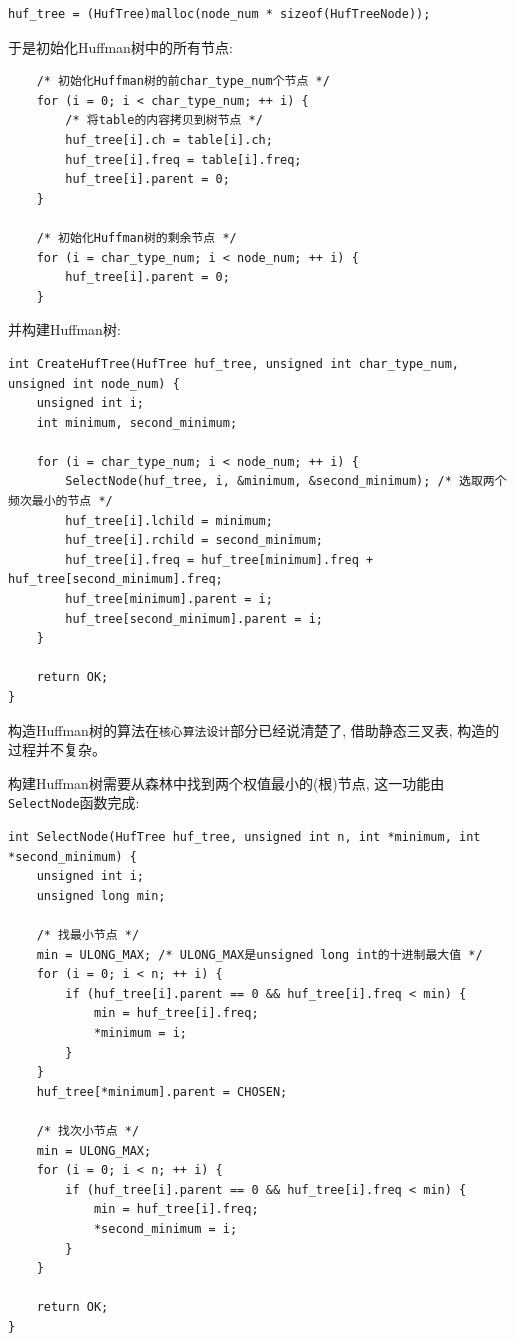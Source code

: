 \documentclass{ctexart}
\begin{document}
{\setmainfont{Courier New Bold}              
\begin{lstlisting}
huf_tree = (HufTree)malloc(node_num * sizeof(HufTreeNode));
\end{lstlisting}}

于是初始化Huffman树中的所有节点:

{\setmainfont{Courier New Bold}              
\begin{lstlisting}
    /* 初始化Huffman树的前char_type_num个节点 */
    for (i = 0; i < char_type_num; ++ i) {
        /* 将table的内容拷贝到树节点 */
        huf_tree[i].ch = table[i].ch;
        huf_tree[i].freq = table[i].freq;
        huf_tree[i].parent = 0;
    }

    /* 初始化Huffman树的剩余节点 */
    for (i = char_type_num; i < node_num; ++ i) {
        huf_tree[i].parent = 0;
    }
\end{lstlisting}}

并构建Huffman树:

{\setmainfont{Courier New Bold}              
\begin{lstlisting}
int CreateHufTree(HufTree huf_tree, unsigned int char_type_num, unsigned int node_num) {
    unsigned int i;
    int minimum, second_minimum;

    for (i = char_type_num; i < node_num; ++ i) {
        SelectNode(huf_tree, i, &minimum, &second_minimum); /* 选取两个频次最小的节点 */
        huf_tree[i].lchild = minimum;
        huf_tree[i].rchild = second_minimum;
        huf_tree[i].freq = huf_tree[minimum].freq + huf_tree[second_minimum].freq;
        huf_tree[minimum].parent = i;
        huf_tree[second_minimum].parent = i;
    }

    return OK;
}
\end{lstlisting}}

构造Huffman树的算法在\texttt{核心算法设计}部分已经说清楚了, 借助静态三叉表, 构造的过程并不复杂。

构建Huffman树需要从森林中找到两个权值最小的(根)节点, 这一功能由\texttt{SelectNode}函数完成:

{\setmainfont{Courier New Bold}              
\begin{lstlisting}
int SelectNode(HufTree huf_tree, unsigned int n, int *minimum, int *second_minimum) {
    unsigned int i;
    unsigned long min;

    /* 找最小节点 */
    min = ULONG_MAX; /* ULONG_MAX是unsigned long int的十进制最大值 */
    for (i = 0; i < n; ++ i) {
        if (huf_tree[i].parent == 0 && huf_tree[i].freq < min) {
            min = huf_tree[i].freq;
            *minimum = i;
        }
    }
    huf_tree[*minimum].parent = CHOSEN;

    /* 找次小节点 */
    min = ULONG_MAX;
    for (i = 0; i < n; ++ i) {
        if (huf_tree[i].parent == 0 && huf_tree[i].freq < min) {
            min = huf_tree[i].freq;
            *second_minimum = i;
        }
    }

    return OK;
}
\end{lstlisting}}
\end{document}
